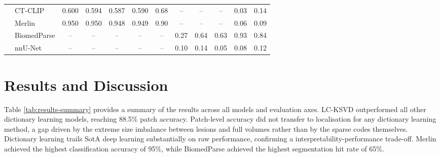 \documentclass{article}
\begin{document}
\begin{table}[t]
{\begin{tabular}{llcccccccccc}
            \hline

            & CT-CLIP
            & 0.600 & 0.594 & 0.587 & 0.590 & 0.68
            & -- & -- & -- & 0.03 & 0.14 \\

            & Merlin
            & 0.950 & 0.950 & 0.948 & 0.949 & 0.90
            & -- & -- & -- & 0.06 & 0.09 \\

            & BiomedParse
            & -- & -- & -- & -- & --
            & 0.27 & 0.64 & 0.63 & 0.93 & 0.84 \\

            & nnU-Net
            & -- & -- & -- & -- & --
            & 0.10 & 0.14 & 0.05 & 0.08 & 0.12 \\

            \hline
        \end{tabular}
    }
\end{table}

\section{Results and Discussion}
\label{sec:results}

Table \ref{tab:results-summary} provides a summary of the results across all models and evaluation axes.
LC-KSVD outperformed all other dictionary learning models, reaching 88.5\% patch accuracy.
Patch-level accuracy did not transfer to localisation for any dictionary learning method,
a gap driven by the extreme size imbalance between lesions and full volumes rather than by
the sparse codes themselves. Dictionary learning trails SotA deep learning substantially on raw performance, confirming a
interpretability-performance trade-off. Merlin achieved the highest classification accuracy of 95\%, while
BiomedParse achieved the highest segmentation hit rate of 65\%.

\vfill
\pagebreak



\end{document}
